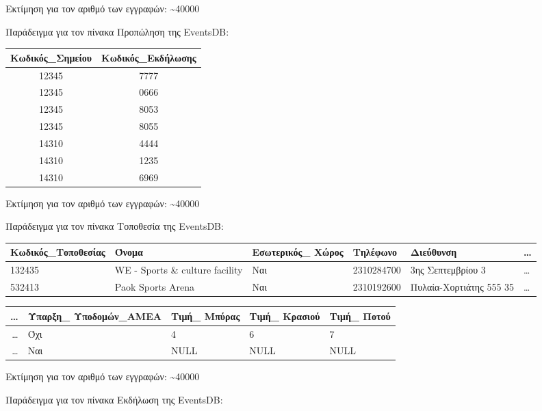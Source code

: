 Εκτίμηση για τον αριθμό των εγγραφών: \textasciitilde 40000

Παράδειγμα για τον πίνακα Προπώληση της EventsDB:

\begin{table}[H]
  \centering
  \footnotesize
  \begin{tabular}{|c|c|}
  \hline
  Κωδικός\_Σημείου & Κωδικός\_Εκδήλωσης \\ \hline
  12345 & 7777 \\ \hline
  12345 & 0666 \\ \hline
  12345 & 8053 \\ \hline
  12345 & 8055 \\ \hline
  14310 & 4444 \\ \hline
  14310 & 1235 \\ \hline
  14310 & 6969 \\ \hline
\end{tabular}
\end{table}
  
Εκτίμηση για τον αριθμό των εγγραφών: \textasciitilde 40000

Παράδειγμα για τον πίνακα Τοποθεσία της EventsDB:

\begin{table}[H]
  \centering
  \footnotesize
  \begin{tabular}{|p{1.8cm}|p{2cm}|p{1.6cm}|p{1.6cm}|p{2.5cm}|l}
  \hline
  Κωδικός\_Τοποθεσίας & Όνομα & Εσωτερικός\_ Χώρος & Τηλέφωνο & Διεύθυνση
    & \ldots \\ \hline
  132435 & WE - Sports \& culture facility & Ναι & 2310284700 & 3ης Σεπτεμβρίου 3 & \ldots \\ \hline
  532413 & Paok Sports Arena & Ναι & 2310192600 & Πυλαία-Χορτιάτης 555 35 &\ldots \\ \hline
  \end{tabular}
  \begin{tabular}{r|p{2cm}|p{2cm}|p{2cm}|p{2cm}|}
  \hline
    \ldots & Ύπαρξη\_ Υποδομών\_ΑΜΕΑ & Τιμή\_ Μπύρας & Τιμή\_ Κρασιού
    & Τιμή\_ Ποτού \\ \hline
    \ldots & Όχι & 4 & 6 & 7 \\ \hline
    \ldots & Ναι & NULL & NULL & NULL \\ \hline
\end{tabular}
\end{table}
  
Εκτίμηση για τον αριθμό των εγγραφών: \textasciitilde 40000

Παράδειγμα για τον πίνακα Εκδήλωση της EventsDB:

